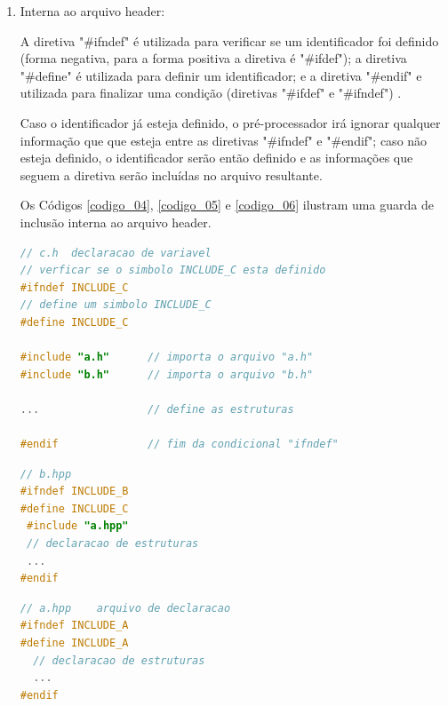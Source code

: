 \begin{enumerate}
\item Interna ao arquivo header:

A diretiva "\#ifndef" é utilizada para verificar se um identificador foi 
 definido (forma negativa, para a forma positiva a diretiva é "\#ifdef"); a 
diretiva "\#define" é utilizada para definir um identificador; e a diretiva 
"\#endif" e utilizada para finalizar  uma condição (diretivas "\#ifdef" e 
"\#ifndef") \cite{ref42}.

Caso o identificador já esteja definido, o pré-processador irá ignorar 
qualquer informação que que esteja entre as diretivas "\#ifndef"  e "\#endif";
 caso não esteja definido, o identificador serão então definido e as informações
 que seguem a diretiva serão incluídas no arquivo resultante\cite{ref42}.

Os Códigos \ref{codigo_04}, \ref{codigo_05} e \ref{codigo_06} ilustram uma 
guarda de inclusão interna ao arquivo header.

\begin{lstlisting}[language=C++,frame=single,title={Código 4: Arquivo c.hpp que
                                       inclue arquivos a.hpp e b.hpp que contém
                                                 guardasd de inclusão interna },
                                                            label=codigo_04]
// c.h  declaracao de variavel
// verficar se o simbolo INCLUDE_C esta definido
#ifndef INCLUDE_C   
// define um simbolo INCLUDE_C
#define INCLUDE_C   

#include "a.h"      // importa o arquivo "a.h"
#include "b.h"      // importa o arquivo "b.h"

...                 // define as estruturas

#endif              // fim da condicional "ifndef" 
\end{lstlisting}

\begin{lstlisting}[language=C++,frame=single,title={Código 5: 
                                    Arquivo b.hpp que inclue o arquivo a.h},
                                                            label=codigo_05]
// b.hpp
#ifndef INCLUDE_B
#define INCLUDE_C
 #include "a.hpp"
 // declaracao de estruturas 
 ...
#endif    
\end{lstlisting}

\begin{lstlisting}[language=C++,frame=single,title={Código 6: Arquivo a.hpp 
                                    contendo guardas de inclusão interna},
                                                            label=codigo_06]
// a.hpp    arquivo de declaracao
#ifndef INCLUDE_A
#define INCLUDE_A
  // declaracao de estruturas 
  ...
#endif
\end{lstlisting}



\end{enumerate}
